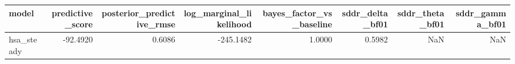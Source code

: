 \begin{tabular}{lrrrrrrr}
\toprule
model & predictive\_score & posterior\_predictive\_rmse & log\_marginal\_likelihood & bayes\_factor\_vs\_baseline & sddr\_delta\_bf01 & sddr\_theta\_bf01 & sddr\_gamma\_bf01 \\
\midrule
hsa\_steady & -92.4920 & 0.6086 & -245.1482 & 1.0000 & 0.5982 & NaN & NaN \\
\bottomrule
\end{tabular}
